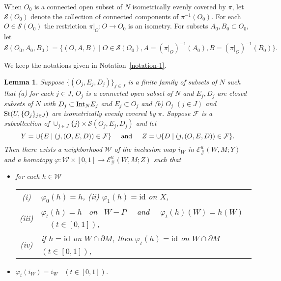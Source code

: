 \documentclass[11pt, fleqn]{amsart}
\newtheorem{lemma}{Lemma}[section]
\theoremstyle{definition}
\newcommand{\cal}{\mathcal}
\renewcommand{\phi}{\varphi}
\newcommand{\lra}{\longrightarrow}
\newcommand{\id}{\mathrm{id}}
\newcommand{\E}{\mathcal E}
\newcommand{\W}{\mathcal W}
\begin{document}
When $O_0$ is a connected open subset of $N$ isometrically evenly covered by $\pi$, 
let ${\cal S}(O_0)$ denote the collection of connected components of $\pi^{-1}(O_0)$. 
 For each $O \in {\cal S}(O_0)$ the restriction $\pi|_O : O \to O_0$ is an isometry. 
For subsets $A_0, B_0 \subset O_0$, let 
$${\cal S}(O_0, A_0, B_0) = \{ (O, A, B) \mid O \in {\cal S}(O_0), A = (\pi|_O)^{-1}(A_0), B = (\pi|_O)^{-1}(B_0)\}.$$ 


We keep the notations given in Notation~\ref{notation-1}. 

\begin{lemma}\label{lem_2}
Suppose $\{ (O_j, E_j, D_j) \}_{j\in J}$ is a finite family of subsets of $N$ such that 
(a) for each $j \in J$, $O_j$ is a connected open subset of $N$ and $E_j, D_j$ are closed subsets of $N$ with 
$D_j \subset {\rm Int}_N E_j$ and $E_j \subset O_j$ and 
(b) $O_j$ $(j \in J)$ and ${\rm St}(U, \{ O_j \}_{j \in J})$ are isometrically evenly covered by $\pi$.  
Suppose ${\cal F}$ is a subcollection of $\cup_{j \in J} \{ j \} \times {\cal S}(O_j, E_j, D_j)$ and 
let 
$$Y = \cup \{ E \mid (j, (O, E, D)) \in {\cal F} \} \hspace{5mm} \text{and} \hspace{5mm}   
Z = \cup \{ D \mid (j, (O, E, D)) \in {\cal F} \}.$$ 
Then there exists a neighborhood $\W$ of the inclusion map $i_W$ in $\E^u_\#(W, M; Y)$ and 
a homotopy $\phi : \W \times [0,1] \lra \E^u_\#(W, M; Z)$ such that 
\begin{itemize} 
\item[(1)] for each $h \in \W$ \\ 
\begin{tabular}[t]{c@{\ \,}l}
{\rm (i)} & $\phi_0(h) = h$, \hspace{3mm} 
{\rm (ii)} $\phi_1(h) = \id$ on $X$, \\[2mm] 
{\rm (iii)}  & $\phi_t(h) = h$ \ on \ $W - P$ \ \ and \ \ $\phi_t(h)(W) = h(W)$ \ \ $(t \in [0,1])$, \\[2mm] 
{\rm (iv)} & if $h = \id$ on $W \cap \partial M$, then $\varphi_t(h) = \id$ on $W \cap \partial M$ $(t \in [0,1])$, 
\end{tabular} 
\vskip 1.5mm 
\item[(2)] $\phi_t(i_W) = i_W$ \ $(t \in [0,1])$.
\end{itemize} 
\end{lemma} 
\end{document}
